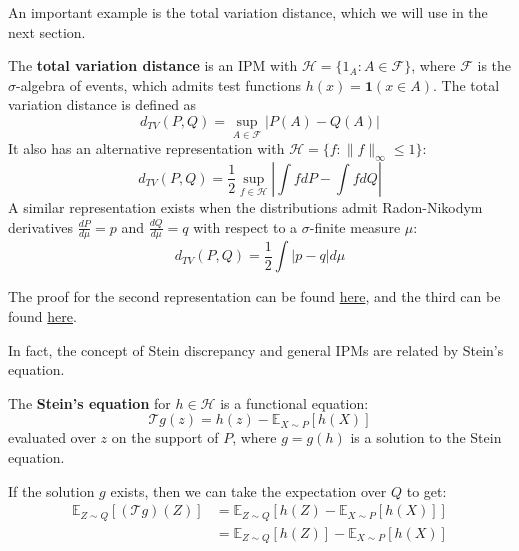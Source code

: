 \documentclass{article}
\begin{document}
An important example is the total variation distance, which we will use in the next section.  

\begin{example}
    The \textbf{total variation distance} is an IPM with $\mathcal{H}=\{1_A: A \in \mathcal{F}\}$, where $\mathcal{F}$ is the $\sigma$-algebra of events, which admits test functions $h(x) = \mathbf{1}(x\in A)$. The total variation distance is defined as  
    \begin{equation}
        d_{TV}(P, Q) = \sup_{A \in \mathcal{F}} |P(A) - Q(A)|
        \label{eq:total_variation_distance}
    \end{equation}
    It also has an alternative representation with $\mathcal{H} = \{f: \|f\|_\infty \leq 1\}$:
    \begin{equation*}
        d_{TV}(P, Q) = \frac{1}{2} \sup_{f \in \mathcal{H}}\left|\int f dP - \int f dQ\right|
    \end{equation*}
    A similar representation exists when the distributions admit Radon-Nikodym derivatives $\frac{dP}{d\mu}=p$ and $\frac{dQ}{d\mu}=q$ with respect to a $\sigma$-finite measure $\mu$:
    \begin{equation*}
        d_{TV}(P, Q) = \frac{1}{2} \int |p - q| d\mu
    \end{equation*}
\end{example}

The proof for the second representation can be found \href{https://math.stackexchange.com/questions/3287889/show-that-the-total-variation-distance-of-probability-measures-mu-nu-is-equa}{here}, and the third can be found \href{https://math.stackexchange.com/questions/1481101/definition-of-the-total-variation-distance-vp-q-frac12-int-p-qd-n}{here}.  

In fact, the concept of Stein discrepancy and general IPMs are related by Stein's equation.

\begin{definition}\label{def:stein_equation}
    The \textbf{Stein's equation} for $h\in \mathcal{H}$ is a functional equation:
    \begin{equation*}
        \mathcal{T}g (z) = h(z) - \mathbb{E}_{X\sim P}[h(X)]
    \end{equation*}
    evaluated over $z$ on the support of $P$, where $g=g(h)$ is a solution to the Stein equation.
\end{definition}

If the solution $g$ exists, then we can take the expectation over $Q$ to get:
\begin{align*}
    \mathbb{E}_{Z\sim Q}[(\mathcal{T}g)(Z)] &= \mathbb{E}_{Z\sim Q}[h(Z) - \mathbb{E}_{X\sim P}[h(X)]]\\
    &= \mathbb{E}_{Z\sim Q}[h(Z)] - \mathbb{E}_{X\sim P}[h(X)]
\end{align*}
\end{document}
